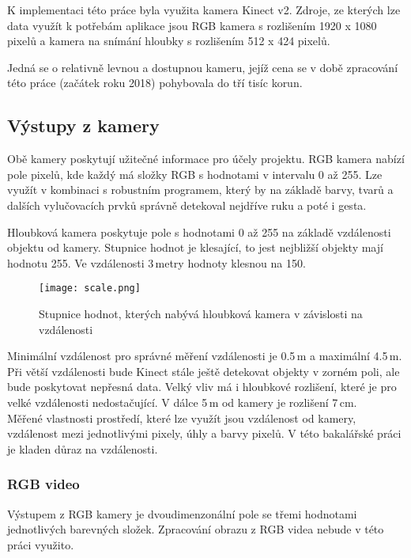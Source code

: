 K implementaci této práce byla využita kamera Kinect v2. Zdroje, ze kterých lze data využít k potřebám aplikace jsou RGB kamera s rozlišením 1920 x 1080 pixelů a kamera na snímání hloubky s rozlišením 512 x 424 pixelů.

Jedná se o relativně levnou a dostupnou kameru, jejíž cena se v době zpracování této práce (začátek roku 2018) pohybovala do tří tisíc korun.

\subsection{Výstupy z kamery}

Obě kamery poskytují užitečné informace pro účely projektu. RGB kamera nabízí pole pixelů, kde každý má složky RGB s hodnotami v intervalu 0 až 255. Lze využít v kombinaci s robustním programem, který by na základě barvy, tvarů a dalších vylučovacích prvků správně detekoval nejdříve ruku a poté i gesta. %

Hloubková kamera poskytuje pole s hodnotami 0 až 255 na základě vzdálenosti objektu od kamery. Stupnice hodnot je klesající, to jest nejbližší objekty mají hodnotu 255. Ve vzdálenosti 3\,metry hodnoty klesnou na 150. 

\begin{figure}[htp]
\centering
\texttt{[image: scale.png]}
\caption{Stupnice hodnot, kterých nabývá hloubková kamera v závislosti na vzdálenosti}
\label{fig:scale}
\label{pic9}
\end{figure}

Minimální vzdálenost pro správné měření vzdálenosti je 0.5\,m a maximální 4.5\,m. Při větší vzdálenosti bude Kinect stále ještě detekovat objekty v zorném poli, ale bude poskytovat nepřesná data. Velký vliv má i hloubkové rozlišení, které je pro velké vzdálenosti nedostačující. V dálce 5\,m od kamery je rozlišení 7\,cm.\\

Měřené vlastnosti prostředí, které lze využít jsou vzdálenost od kamery, vzdálenost mezi jednotlivými pixely, úhly a barvy pixelů. V této bakalářské práci je kladen důraz na vzdálenosti.

\subsubsection{RGB video}
Výstupem z RGB kamery je dvoudimenzonální pole se třemi hodnotami jednotlivých barevných složek. Zpracování obrazu z RGB videa nebude v této práci využito. \\

